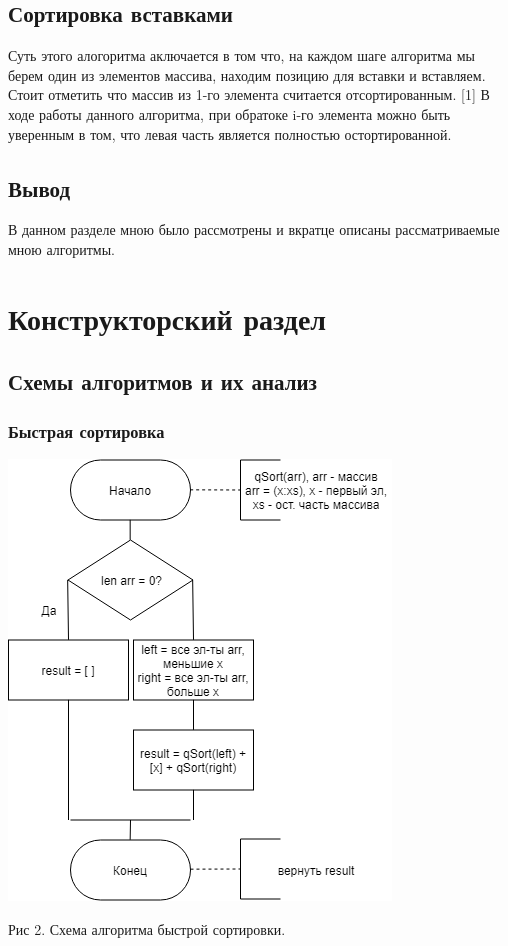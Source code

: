 \documentclass[12pt]{report}
\begin{document}
\section{Сортировка вставками}

	Суть этого алогоритма аключается в том что, на каждом шаге алгоритма мы берем один из элементов массива, находим позицию для вставки и вставляем. Стоит отметить что массив из 1-го элемента считается отсортированным. [1] В ходе работы данного алгоритма, при обратоке i-го элемента можно быть уверенным в том, что левая часть является полностью остортированной.
	
\section*{Вывод}

	В данном разделе мною было рассмотрены и вкратце описаны рассматриваемые мною алгоритмы.


\chapter{Конструкторский раздел}
\section{Схемы алгоритмов и их анализ}

\subsection{Быстрая сортировка}


\begin{center}
		\includegraphics[scale=0.6]{qSort.png}
		
			Рис 2. Схема алгоритма быстрой сортировки.
\end{center}
\end{document}

